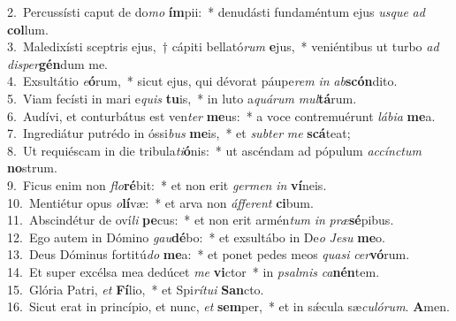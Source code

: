{2.~}Percussísti caput de do\textit{mo} \textbf{ím}pii:~* denudásti fundaméntum ejus \textit{us}\textit{que} \textit{ad} \textbf{col}lum.\\
{3.~}Maledixísti sceptris ejus,~† cápiti bellató\textit{rum} \textbf{e}jus,~* veniéntibus ut turbo \textit{ad} \textit{di}\textit{sper}\textbf{gén}dum me.\\
{4.~}Exsultátio \textit{e}\textbf{ó}rum,~* sicut ejus, qui dévorat páupe\textit{rem} \textit{in} \textit{ab}\textbf{scón}dito.\\
{5.~}Viam fecísti in mari e\textit{quis} \textbf{tu}is,~* in luto a\textit{quá}\textit{rum} \textit{mul}\textbf{tá}rum.\\
{6.~}Audívi, et conturbátus est ven\textit{ter} \textbf{me}us:~* a voce contremuérunt \textit{lá}\textit{bi}\textit{a} \textbf{me}a.\\
{7.~}Ingrediátur putrédo in óssi\textit{bus} \textbf{me}is,~* et \textit{sub}\textit{ter} \textit{me} \textbf{scá}teat;\\
{8.~}Ut requiéscam in die tribula\textit{ti}\textbf{ó}nis:~* ut ascéndam ad pópulum \textit{ac}\textit{cín}\textit{ctum} \textbf{no}strum.\\
{9.~}Ficus enim non \textit{flo}\textbf{ré}bit:~* et non erit \textit{ger}\textit{men} \textit{in} \textbf{ví}neis.\\
{10.~}Mentiétur opus \textit{o}\textbf{lí}væ:~* et arva non \textit{áf}\textit{fe}\textit{rent} \textbf{ci}bum.\\
{11.~}Abscindétur de oví\textit{li} \textbf{pe}cus:~* et non erit armén\textit{tum} \textit{in} \textit{præ}\textbf{sé}pibus.\\
{12.~}Ego autem in Dómino \textit{gau}\textbf{dé}bo:~* et exsultábo in De\textit{o} \textit{Je}\textit{su} \textbf{me}o.\\
{13.~}Deus Dóminus fortitú\textit{do} \textbf{me}a:~* et ponet pedes meos \textit{qua}\textit{si} \textit{cer}\textbf{vó}rum.\\
{14.~}Et super excélsa mea dedúcet \textit{me} \textbf{vi}ctor~* in \textit{psal}\textit{mis} \textit{ca}\textbf{nén}tem.\\
{15.~}Glória Patri, \textit{et} \textbf{Fí}lio,~* et Spi\textit{rí}\textit{tu}\textit{i} \textbf{San}cto.\\
{16.~}Sicut erat in princípio, et nunc, \textit{et} \textbf{sem}per,~* et in sǽcula sæ\textit{cu}\textit{ló}\textit{rum}. \textbf{A}men.\\
